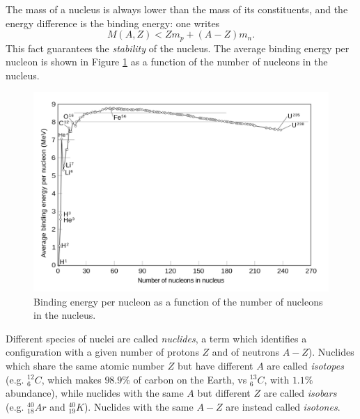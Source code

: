 The mass of a nucleus is always lower than the mass of its constituents, and the energy difference is the binding energy: one writes
\begin{equation*}
    M(A,Z) < Zm_p + (A-Z)m_n.
\end{equation*}
This fact guarantees the \emph{stability} of the nucleus. The average binding energy per nucleon is shown in Figure \ref{nuclear-physics-fig:1} as a function of the number of nucleons in the nucleus.
\begin{figure}[h]
    \centering
    \includegraphics[scale=0.25]{Figures/nuclear-physics-fig1}
    \caption{Binding energy per nucleon as a function of the number of nucleons in the nucleus.}
    \label{nuclear-physics-fig:1}
\end{figure}

Different species of nuclei are called \emph{nuclides}, a term which identifies a configuration with a given number of protons \(Z\) and of neutrons \(A-Z\)). Nuclides which share the same atomic number \(Z\) but have different \(A\) are called \emph{isotopes} (e.g. \(_6^{12}C\), which makes \(98.9\%\) of carbon on the Earth, vs \(_6^{13}C\), with \(1.1\%\) abundance), while nuclides with the same \(A\) but different \(Z\) are called \emph{isobars} (e.g. \(_{18}^{40}Ar\) and \(_{19}^{40}K\)).
Nuclides with the same \(A-Z\) are instead called \emph{isotones}.

